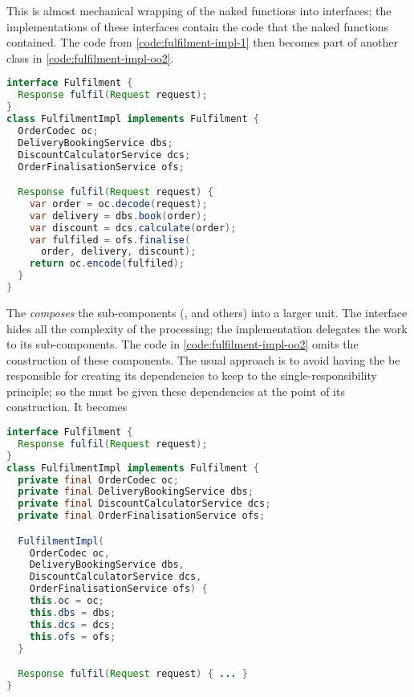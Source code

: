 This is almost mechanical wrapping of the naked functions into interfaces; the implementations of these interfaces contain the code that the naked functions contained. The code from \autoref{code:fulfilment-impl-1} then becomes part of another class in \autoref{code:fulfilment-impl-oo2}.

\begin{lstlisting}[caption={Fulfilment OO implementation II}, label={code:fulfilment-impl-oo2}, language=Java, escapechar=|]
interface Fulfilment {
  Response fulfil(Request request);
}
class FulfilmentImpl implements Fulfilment {
  OrderCodec oc;
  DeliveryBookingService dbs;
  DiscountCalculatorService dcs;
  OrderFinalisationService ofs;

  Response fulfil(Request request) {
    var order = oc.decode(request);
    var delivery = dbs.book(order);
    var discount = dcs.calculate(order);
    var fulfiled = ofs.finalise(
      order, delivery, discount);
    return oc.encode(fulfiled);
  }
}
\end{lstlisting}

The  \emph{composes} the sub-components (,  and others) into a larger unit. The interface  hides all the complexity of the processing; the implementation  delegates the work to its sub-components. The code in \autoref{code:fulfilment-impl-oo2} omits the construction of these components. The usual approach is to avoid having the  be responsible for creating its dependencies to keep to the single-responsibility principle; so the  must be given these dependencies at the point of its construction. It becomes 

\begin{lstlisting}[caption={Fulfilment OO implementation II}, label={code:fulfilment-impl-oo3}, language=Java, escapechar=|]
interface Fulfilment {
  Response fulfil(Request request);
}
class FulfilmentImpl implements Fulfilment {
  private final OrderCodec oc;
  private final DeliveryBookingService dbs;
  private final DiscountCalculatorService dcs;
  private final OrderFinalisationService ofs;

  FulfilmentImpl(
    OrderCodec oc, 
    DeliveryBookingService dbs,
    DiscountCalculatorService dcs,
    OrderFinalisationService ofs) {
    this.oc = oc;
    this.dbs = dbs;
    this.dcs = dcs;
    this.ofs = ofs;
  }

  Response fulfil(Request request) { ... }
}
\end{lstlisting}

